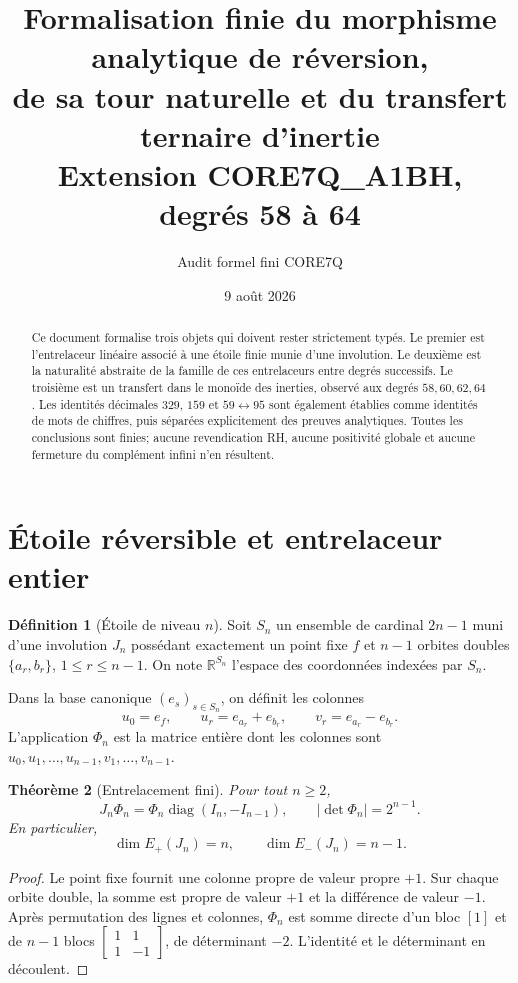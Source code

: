 \documentclass[11pt,a4paper]{article}
\title{Formalisation finie du morphisme analytique de réversion,\\
de sa tour naturelle et du transfert ternaire d'inertie\\
\large Extension CORE7Q\_A1BH, degrés 58 à 64}
\author{Audit formel fini CORE7Q}
\date{9 août 2026}
\newtheorem{theorem}{Théorème}[section]
\theoremstyle{definition}
\newtheorem{definition}[theorem]{Définition}
\newcommand{\diag}{\operatorname{diag}}
\begin{document}
\maketitle

\begin{abstract}
Ce document formalise trois objets qui doivent rester strictement typés. Le premier est
l'entrelaceur linéaire associé à une étoile finie munie d'une involution. Le deuxième est
la naturalité abstraite de la famille de ces entrelaceurs entre degrés successifs. Le
troisième est un transfert dans le monoïde des inerties, observé aux degrés
$58,60,62,64$. Les identités décimales $329$, $159$ et $59\leftrightarrow95$ sont
également établies comme identités de mots de chiffres, puis séparées explicitement des
preuves analytiques. Toutes les conclusions sont finies; aucune revendication RH, aucune
positivité globale et aucune fermeture du complément infini n'en résultent.
\end{abstract}

\section{Étoile réversible et entrelaceur entier}

\begin{definition}[Étoile de niveau $n$]
Soit $S_n$ un ensemble de cardinal $2n-1$ muni d'une involution $J_n$ possédant
exactement un point fixe $f$ et $n-1$ orbites doubles
$\{a_r,b_r\}$, $1\le r\le n-1$. On note $\mathbb{R}^{S_n}$ l'espace des
coordonnées indexées par $S_n$.
\end{definition}

Dans la base canonique $(e_s)_{s\in S_n}$, on définit les colonnes
\[
 u_0=e_f,\qquad u_r=e_{a_r}+e_{b_r},\qquad
 v_r=e_{a_r}-e_{b_r}.
\]
L'application $\Phi_n$ est la matrice entière dont les colonnes sont
$u_0,u_1,\ldots,u_{n-1},v_1,\ldots,v_{n-1}$.

\begin{theorem}[Entrelacement fini]
Pour tout $n\ge2$,
\[
 J_n\Phi_n=\Phi_n\diag(I_n,-I_{n-1}),
 \qquad |\det\Phi_n|=2^{n-1}.
\]
En particulier,
\[
 \dim E_+(J_n)=n,\qquad \dim E_-(J_n)=n-1.
\]
\end{theorem}

\begin{proof}
Le point fixe fournit une colonne propre de valeur propre $+1$. Sur chaque orbite
double, la somme est propre de valeur $+1$ et la différence de valeur $-1$. Après
permutation des lignes et colonnes, $\Phi_n$ est somme directe d'un bloc $[1]$ et de
$n-1$ blocs $\left[\begin{smallmatrix}1&1\\1&-1\end{smallmatrix}\right]$, de
déterminant $-2$. L'identité et le déterminant en découlent.
\end{proof}
\end{document}
